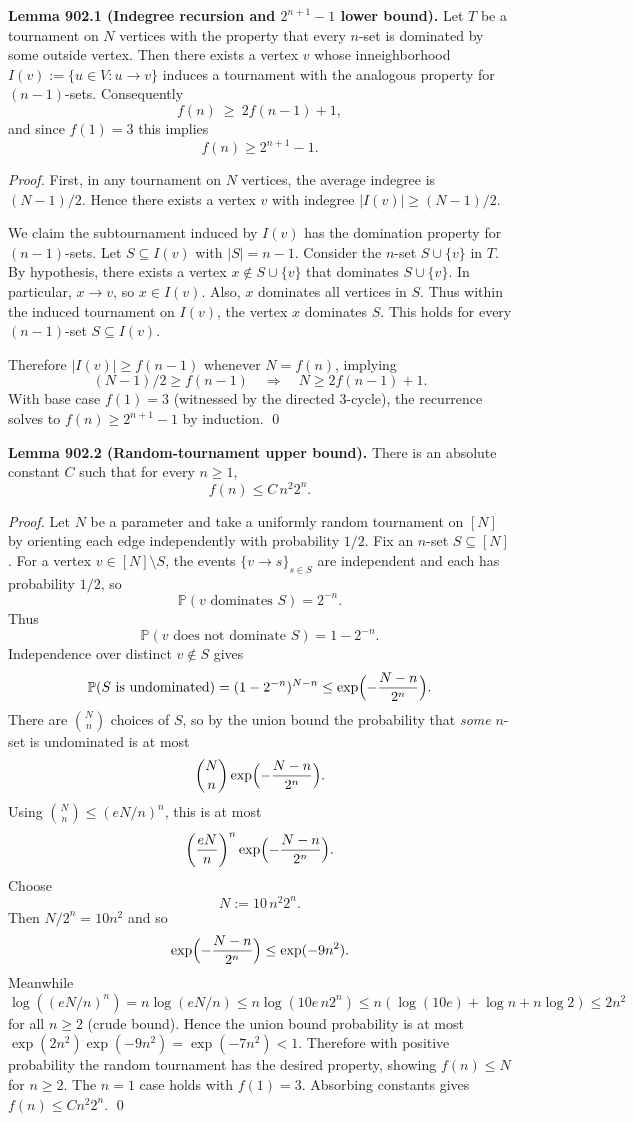 \medskip
\noindent\textbf{Lemma 902.1 (Indegree recursion and $2^{n+1}-1$ lower bound).}
Let $T$ be a tournament on $N$ vertices with the property that every $n$-set is
dominated by some outside vertex. Then there exists a vertex $v$ whose
inneighborhood $I(v):=\{u\in V: u\to v\}$ induces a tournament with the analogous
property for $(n-1)$-sets.
Consequently
\[ f(n)\ \ge\ 2 f(n-1)+1, \]
and since $f(1)=3$ this implies
\[ f(n)\ge 2^{n+1}-1. \]

\emph{Proof.}
First, in any tournament on $N$ vertices, the average indegree is $(N-1)/2$.
Hence there exists a vertex $v$ with indegree
$|I(v)|\ge (N-1)/2$.

We claim the subtournament induced by $I(v)$ has the domination property for
$(n-1)$-sets. Let $S\subseteq I(v)$ with $|S|=n-1$.
Consider the $n$-set $S\cup\{v\}$ in $T$.
By hypothesis, there exists a vertex $x\notin S\cup\{v\}$ that dominates
$S\cup\{v\}$.
In particular, $x\to v$, so $x\in I(v)$.
Also, $x$ dominates all vertices in $S$.
Thus within the induced tournament on $I(v)$, the vertex $x$ dominates $S$.
This holds for every $(n-1)$-set $S\subseteq I(v)$.

Therefore $|I(v)|\ge f(n-1)$ whenever $N=f(n)$, implying
\[(N-1)/2 \ge f(n-1)\quad\Rightarrow\quad N\ge 2f(n-1)+1.
\]
With base case $f(1)=3$ (witnessed by the directed 3-cycle), the recurrence solves
to $f(n)\ge 2^{n+1}-1$ by induction.
\qed

\medskip
\noindent\textbf{Lemma 902.2 (Random-tournament upper bound).}
There is an absolute constant $C$ such that for every $n\ge 1$,
\[ f(n)\le C\, n^2 2^n. \]

\emph{Proof.}
Let $N$ be a parameter and take a uniformly random tournament on $[N]$ by
orienting each edge independently with probability $1/2$.
Fix an $n$-set $S\subseteq[N]$.
For a vertex $v\in[N]\setminus S$, the events $\{v\to s\}_{s\in S}$ are independent
and each has probability $1/2$, so
\[\mathbb{P}(v\text{ dominates }S)=2^{-n}.
\]
Thus
\[\mathbb{P}(v\text{ does not dominate }S)=1-2^{-n}.
\]
Independence over distinct $v\notin S$ gives
\[
\mathbb{P}(S\text{ is undominated}) = (1-2^{-n})^{N-n}
\le \exp\Bigl(-\frac{N-n}{2^n}\Bigr).
\]
There are $\binom{N}{n}$ choices of $S$, so by the union bound the probability
that \emph{some} $n$-set is undominated is at most
\[
\binom{N}{n}\exp\Bigl(-\frac{N-n}{2^n}\Bigr).
\]
Using $\binom{N}{n}\le (eN/n)^n$, this is at most
\[
\left(\frac{eN}{n}\right)^n \exp\Bigl(-\frac{N-n}{2^n}\Bigr).
\]
Choose
\[ N := 10\,n^2 2^n. \]
Then $N/2^n=10n^2$ and so
\[
\exp\Bigl(-\frac{N-n}{2^n}\Bigr) \le \exp(-9n^2).
\]
Meanwhile
\[
\log\left( (eN/n)^n\right) = n\log(eN/n) \le n\log(10e\,n2^n)
\le n(\log(10e)+\log n + n\log 2)\le 2n^2
\]
for all $n\ge 2$ (crude bound).
Hence the union bound probability is at most $\exp(2n^2)\exp(-9n^2)=\exp(-7n^2)<1$.
Therefore with positive probability the random tournament has the desired
property, showing $f(n)\le N$ for $n\ge 2$.
The $n=1$ case holds with $f(1)=3$.
Absorbing constants gives $f(n)\le Cn^2 2^n$.
\qed

